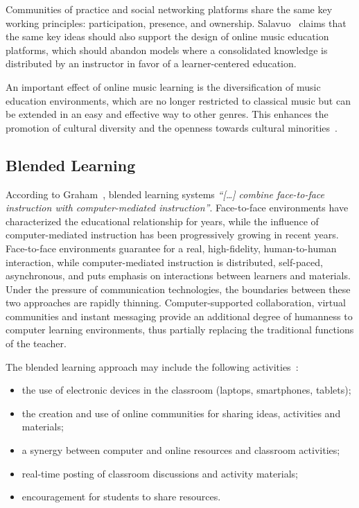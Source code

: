 \documentclass[10pt,journal,compsoc]{IEEEtran}
\begin{document}
Communities of practice and social networking platforms share the same key working principles: participation, presence, and ownership. Salavuo~\cite{salavuo2008social} claims that the same key ideas should also support the design of online music education platforms, which should abandon models where a consolidated knowledge is distributed by an instructor in favor of a learner-centered education.

An important effect of online music learning is the diversification of music education environments, which are no longer restricted to classical music but can be extended in an easy and effective way to other genres. This enhances the promotion of cultural diversity and the openness towards cultural minorities~\cite{ruthmann2012music}. 




\subsection{Blended Learning}
\label{subsec:BL}

According to Graham~\cite{graham2006blended}, blended learning systems \textit{``[\ldots] combine face-to-face instruction with computer-mediated instruction''}. Face-to-face environments have characterized the educational relationship for years, while the influence of computer-mediated instruction has been progressively growing in recent years. Face-to-face environments guarantee for a real, high-fidelity, human-to-human interaction, while computer-mediated instruction is distributed, self-paced, asynchronous, and puts emphasis on interactions between learners and materials. Under the pressure of communication technologies, the boundaries between these two approaches are rapidly thinning. Computer-supported collaboration, virtual communities and instant messaging provide an additional degree of humanness to computer learning environments, thus partially replacing the traditional functions of the teacher. 

The blended learning approach may include the following activities~\cite{louise2016impact}:
\begin{itemize}
	\item the use of electronic devices in the classroom (laptops, smartphones, tablets);
	\item the creation and use of online communities for sharing ideas, activities and materials;
	\item a synergy between computer and online resources and classroom activities;
	\item real-time posting of classroom discussions and activity materials;
	\item encouragement for students to share resources.
\end{itemize}
\end{document}

